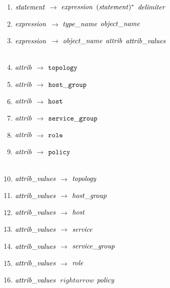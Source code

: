 

\begin{enumerate}
 \item \noindent ${\it statement}$ $\rightarrow$ ${\it expression}$ $({\it statement})^{*}$ ${\it delimiter}$ \\ 
  \item ${\it expression}$ $\rightarrow$ ${\it type\_name}$ ${\it object\_name}$ \\ 
  \item ${\it expression}$ $\rightarrow$ ${\it object\_name}$ ${\it attrib}$ ${\it attrib\_values}$ \\\\ 
  
\item \noindent ${\it attrib}$ $\rightarrow$ ${\tt topology}$ \\ 
\item ${\it attrib}$ $\rightarrow$ ${\tt host\_group}$ \\
 \item ${\it attrib}$ $\rightarrow$ ${\tt host}$ \\ 
\item ${\it attrib}$ $\rightarrow$ ${\tt service\_group}$ \\ 
\item ${\it attrib}$ $\rightarrow$ ${\tt role}$ \\ 
\item ${\it attrib}$ $\rightarrow$ ${\tt policy}$ \\\\ 


\item \noindent ${\it attrib\_values}$ $\rightarrow$ ${\it topology}$ \\ 
\item ${\it attrib\_values}$ $\rightarrow$ ${\it host\_group}$ \\ 
\item ${\it attrib\_values}$ $\rightarrow$ ${\it host}$ \\ 
\item ${\it attrib\_values}$ $\rightarrow$ ${\it service}$ \\ 
\item ${\it attrib\_values}$ $\rightarrow$ ${\it service\_group}$ \\ 
\item ${\it attrib\_values}$ $\rightarrow$ ${\it role}$ \\ 
\item ${\it attrib\_values}$ $\ rightarrow$ ${\it policy}$ \\\\ 


\end{enumerate}
